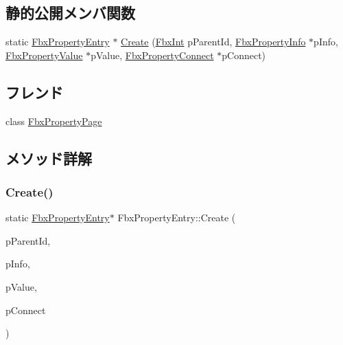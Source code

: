 \subsection*{静的公開メンバ関数}
\begin{DoxyCompactItemize}
\item 
static \hyperlink{class_fbx_property_entry}{Fbx\+Property\+Entry} $\ast$ \hyperlink{class_fbx_property_entry_a7bdf080b6151e2cf42444c207cdd454b}{Create} (\hyperlink{fbxtypes_8h_a088fa96de3b0b3ea69f0f6afef525dfb}{Fbx\+Int} p\+Parent\+Id, \hyperlink{class_fbx_property_info}{Fbx\+Property\+Info} $\ast$p\+Info, \hyperlink{class_fbx_property_value}{Fbx\+Property\+Value} $\ast$p\+Value, \hyperlink{class_fbx_property_connect}{Fbx\+Property\+Connect} $\ast$p\+Connect)
\end{DoxyCompactItemize}
\subsection*{フレンド}
\begin{DoxyCompactItemize}
\item 
class \hyperlink{class_fbx_property_entry_ad8065889ce44304e7cc811caf583781e}{Fbx\+Property\+Page}
\end{DoxyCompactItemize}


\subsection{メソッド詳解}
\mbox{\label{class_fbx_property_entry_a7bdf080b6151e2cf42444c207cdd454b}} 
\subsubsection{\texorpdfstring{Create()}{Create()}}
{\footnotesize\ttfamily static \hyperlink{class_fbx_property_entry}{Fbx\+Property\+Entry}$\ast$ Fbx\+Property\+Entry\+::\+Create (\begin{DoxyParamCaption}\item[{\hyperlink{fbxtypes_8h_a088fa96de3b0b3ea69f0f6afef525dfb}{Fbx\+Int}}]{p\+Parent\+Id,  }\item[{\hyperlink{class_fbx_property_info}{Fbx\+Property\+Info} $\ast$}]{p\+Info,  }\item[{\hyperlink{class_fbx_property_value}{Fbx\+Property\+Value} $\ast$}]{p\+Value,  }\item[{\hyperlink{class_fbx_property_connect}{Fbx\+Property\+Connect} $\ast$}]{p\+Connect }\end{DoxyParamCaption})\hspace{0.3cm}{\ttfamily [static]}}


